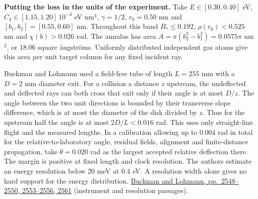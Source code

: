 \documentclass[11pt,a4paper]{article}
\begin{document}
\textbf{Putting the loss in the units of the experiment.} Take
\(E\in[0.30,0.40]\) eV, \(C_4\in[1.15,1.20]\,10^{-3}\) eV nm\(^4\),
\(\gamma=1/2\), \(r_0=0.50\) nm and \([b_1,b_2]=[0.55,0.60]\) nm.
Throughout this band \(B_*\le0.192\), \(\rho(r_0)<0.525\) nm and
\(\chi(b)>0.026\) rad. The annulus has area
\(A=\pi(b_2^2-b_1^2)=0.0575\pi\) nm\(^2\), or \(18.06\) square
ångströms. Uniformly distributed independent gas atoms give this area
per unit target column for any fixed incident ray.

Buckman and Lohmann used a field-free tube of length \(L=255\) mm with a
\(D=2\) mm diameter exit. For a collision a distance \(z\) upstream, the
undeflected and deflected rays can both cross that exit only if their
angle is at most \(D/z\). The angle between the two unit directions is
bounded by their transverse slope difference, which is at most the
diameter of the disk divided by \(z\). Thus for the upstream half the
angle is at most \(2D/L<0.016\) rad. This uses only straight-line flight
and the measured lengths. In a calibration allowing up to \(0.004\) rad
in total for the relative-to-laboratory angle, residual fields,
alignment and finite-distance propagation, take \(\theta=0.020\) rad as
the largest accepted relative deflection there. The margin is positive
at fixed length and clock resolution. The authors estimate an energy
resolution below \(20\) meV at \(0.4\) eV. A resolution width alone
gives no hard support for the energy distribution.
\href{https://doi.org/10.1088/0022-3700/19/16/013}{Buckman and Lohmann,
pp.~2548--2550, 2553--2556, 2561} (instrument and resolution passages).
\end{document}
